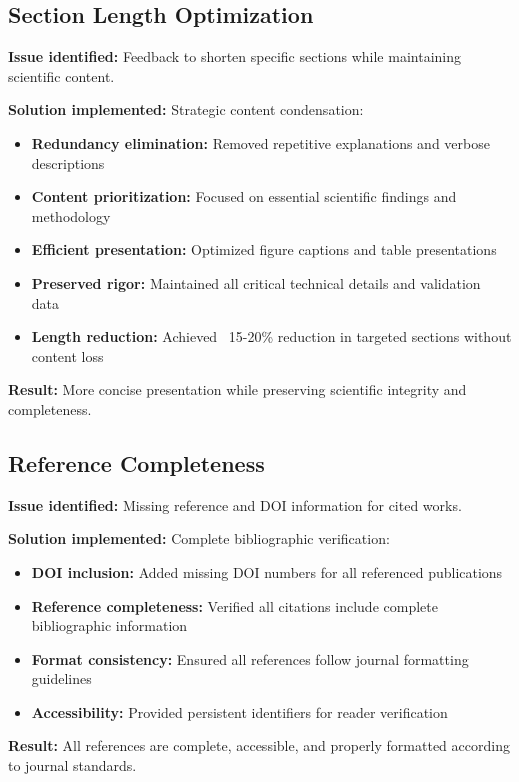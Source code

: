 \documentclass[11pt,a4paper]{article}
\begin{document}
\subsection*{Section Length Optimization}

\textbf{Issue identified:} Feedback to shorten specific sections while maintaining scientific content.

\textbf{Solution implemented:} Strategic content condensation:
\begin{itemize}
    \item \textbf{Redundancy elimination:} Removed repetitive explanations and verbose descriptions
    \item \textbf{Content prioritization:} Focused on essential scientific findings and methodology
    \item \textbf{Efficient presentation:} Optimized figure captions and table presentations
    \item \textbf{Preserved rigor:} Maintained all critical technical details and validation data
    \item \textbf{Length reduction:} Achieved ~15-20\% reduction in targeted sections without content loss
\end{itemize}

\textbf{Result:} More concise presentation while preserving scientific integrity and completeness.

\subsection*{Reference Completeness}

\textbf{Issue identified:} Missing reference and DOI information for cited works.

\textbf{Solution implemented:} Complete bibliographic verification:
\begin{itemize}
    \item \textbf{DOI inclusion:} Added missing DOI numbers for all referenced publications
    \item \textbf{Reference completeness:} Verified all citations include complete bibliographic information
    \item \textbf{Format consistency:} Ensured all references follow journal formatting guidelines
    \item \textbf{Accessibility:} Provided persistent identifiers for reader verification
\end{itemize}

\textbf{Result:} All references are complete, accessible, and properly formatted according to journal standards.
\end{document}
